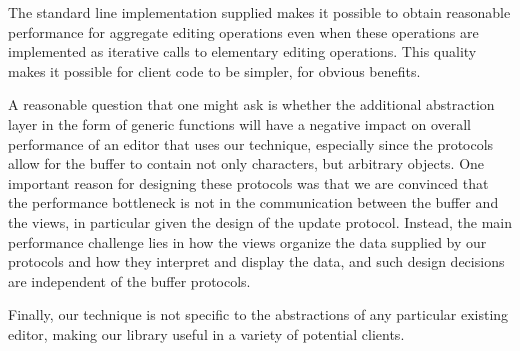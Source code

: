 The standard line implementation supplied makes it possible to obtain
reasonable performance for aggregate editing operations even when
these operations are implemented as iterative calls to elementary
editing operations.  This quality makes it possible for client code to
be simpler, for obvious benefits.

A reasonable question that one might ask is whether the additional
abstraction layer in the form of generic functions will have a
negative impact on overall performance of an editor that uses our
technique, especially since the protocols allow for the buffer to
contain not only characters, but arbitrary objects.  One important
reason for designing these protocols was that we are convinced that
the performance bottleneck is not in the communication between the
buffer and the views, in particular given the design of the update
protocol.  Instead, the main performance challenge lies in how the
views organize the data supplied by our protocols and how they
interpret and display the data, and such design decisions are
independent of the buffer protocols.

Finally, our technique is not specific to the abstractions of any
particular existing editor, making our library useful in a variety of
potential clients.
